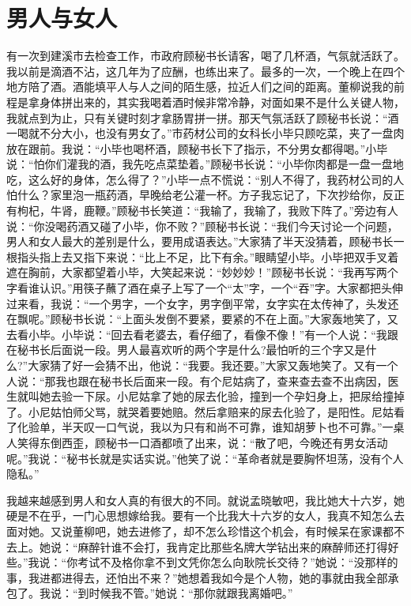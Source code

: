 \documentclass[12pt,oneside]{book}
\begin{document}
\chapter{男人与女人}

有一次到建溪市去检查工作，市政府顾秘书长请客，喝了几杯酒，气氛就活跃了。我以前是滴酒不沾，这几年为了应酬，也练出来了。最多的一次，一个晚上在四个地方陪了酒。酒能填平人与人之间的陌生感，拉近人们之间的距离。董柳说我的前程是拿身体拼出来的，其实我喝着酒时候非常冷静，对面如果不是什么关键人物，我就点到为止，只有关键时刻才拿肠胃拼一拼。那天气氛活跃了顾秘书长说：``酒一喝就不分大小，也没有男女了。''市药材公司的女科长小毕只顾吃菜，夹了一盘肉放在跟前。我说：``小毕也喝杯酒，顾秘书长下了指示，不分男女都得喝。''小毕说：``怕你们灌我的酒，我先吃点菜垫着。''顾秘书长说：``小毕你肉都是一盘一盘地吃，这么好的身体，怎么得了？''小毕一点不慌说：``别人不得了，我药材公司的人怕什么？家里泡一瓶药酒，早晚给老公灌一杯。方子我忘记了，下次抄给你，反正有枸杞，牛肾，鹿鞭。''顾秘书长笑道：``我输了，我输了，我败下阵了。''旁边有人说：``你没喝药酒又碰了小毕，你不败？''顾秘书长说：``我们今天讨论一个问题，男人和女人最大的差别是什么，要用成语表达。''大家猜了半天没猜着，顾秘书长一根指头指上去又指下来说：``比上不足，比下有余。''眼睛望小毕。小毕把双手叉着遮在胸前，大家都望着小毕，大笑起来说：``妙妙妙！''顾秘书长说：``我再写两个字看谁认识。''用筷子蘸了酒在桌子上写了一个``太''字，一个``吞''字。大家都把头伸过来看，我说：``一个男字，一个女字，男字倒平常，女字实在太传神了，头发还在飘呢。''顾秘书长说：``上面头发倒不要紧，要紧的不在上面。''大家轰地笑了，又去看小毕。小毕说：``回去看老婆去，看仔细了，看像不像！''有一个人说：``我跟在秘书长后面说一段。男人最喜欢听的两个字是什么?最怕听的三个字又是什么?''大家猜了好一会猜不出，他说：``我要。我还要。''大家又轰地笑了。又有一个人说：``那我也跟在秘书长后面来一段。有个尼姑病了，查来查去查不出病因，医生就叫她去验一下尿。小尼姑拿了她的尿去化验，撞到一个孕妇身上，把尿给撞掉了。小尼姑怕师父骂，就哭着要她赔。然后拿赔来的尿去化验了，是阳性。尼姑看了化验单，半天叹一口气说，我以为只有和尚不可靠，谁知胡萝卜也不可靠。''一桌人笑得东倒西歪，顾秘书一口酒都喷了出来，说：``散了吧，今晚还有男女活动呢。''我说：``秘书长就是实话实说。''他笑了说：``革命者就是要胸怀坦荡，没有个人隐私。''

我越来越感到男人和女人真的有很大的不同。就说孟晓敏吧，我比她大十六岁，她硬是不在乎，一门心思想嫁给我。要有一个比我大十六岁的女人，我真不知怎么去面对她。又说董柳吧，她去进修了，却不怎么珍惜这个机会，有时候呆在家课都不去上。她说：``麻醉针谁不会打，我肯定比那些名牌大学钻出来的麻醉师还打得好些。''我说：``你考试不及格你拿不到文凭你怎么向耿院长交待？''她说：``没那样的事，我进都进得去，还怕出不来？''她想着我如今是个人物，她的事就由我全部承包了。我说：``到时候我不管。''她说：``那你就跟我离婚吧。''
\end{document}

